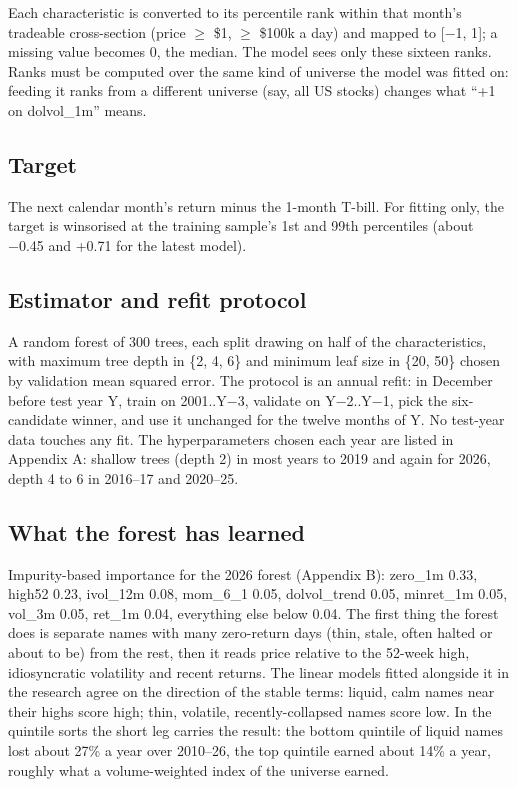 \documentclass[
  10pt,
  a4paper,
]{article}
\begin{document}
Each characteristic is converted to its percentile rank
within that month's tradeable cross-section (price \(\geq\)
\$1, \(\geq\) \$100k a day) and mapped to {[}−1, 1{]}; a
missing value becomes 0, the median. The model sees only
these sixteen ranks. Ranks must be computed over the same
kind of universe the model was fitted on: feeding it ranks
from a different universe (say, all US stocks) changes what
``+1 on dolvol\_1m'' means.

\subsection{Target}\label{target}

The next calendar month's return minus the 1-month T-bill.
For fitting only, the target is winsorised at the training
sample's 1st and 99th percentiles (about −0.45 and +0.71 for
the latest model).

\subsection{Estimator and refit
protocol}\label{estimator-and-refit-protocol}

A random forest of 300 trees, each split drawing on half of
the characteristics, with maximum tree depth in \{2, 4, 6\}
and minimum leaf size in \{20, 50\} chosen by validation
mean squared error. The protocol is an annual refit: in
December before test year Y, train on 2001..Y−3, validate on
Y−2..Y−1, pick the six-candidate winner, and use it
unchanged for the twelve months of Y. No test-year data
touches any fit. The hyperparameters chosen each year are
listed in Appendix A: shallow trees (depth 2) in most years
to 2019 and again for 2026, depth 4 to 6 in 2016--17 and
2020--25.

\subsection{What the forest has
learned}\label{what-the-forest-has-learned}

Impurity-based importance for the 2026 forest (Appendix B):
zero\_1m 0.33, high52 0.23, ivol\_12m 0.08, mom\_6\_1 0.05,
dolvol\_trend 0.05, minret\_1m 0.05, vol\_3m 0.05, ret\_1m
0.04, everything else below 0.04. The first thing the forest
does is separate names with many zero-return days (thin,
stale, often halted or about to be) from the rest, then it
reads price relative to the 52-week high, idiosyncratic
volatility and recent returns. The linear models fitted
alongside it in the research agree on the direction of the
stable terms: liquid, calm names near their highs score
high; thin, volatile, recently-collapsed names score low. In
the quintile sorts the short leg carries the result: the
bottom quintile of liquid names lost about 27\% a year over
2010--26, the top quintile earned about 14\% a year, roughly
what a volume-weighted index of the universe earned.
\end{document}
